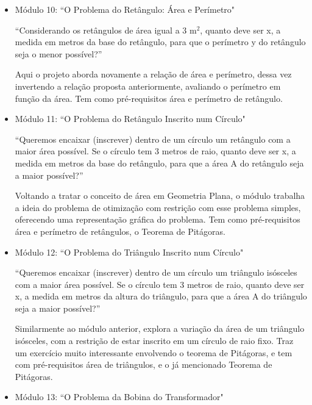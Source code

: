 \begin{itemize}
    
    \item Módulo 10: ``O Problema do Retângulo: Área e Perímetro"
    
    ``Considerando os retângulos de área igual a 3 m$^2$, quanto deve ser x, a medida em metros da base do retângulo, para que o perímetro y do retângulo seja o menor possível?”
    
    Aqui o projeto aborda novamente a relação de área e perímetro, dessa vez invertendo a relação proposta anteriormente, avaliando o perímetro em função da área. Tem como pré-requisitos área e perímetro de retângulo.
    
    \item Módulo 11: ``O Problema do Retângulo Inscrito num Círculo"
    
    ``Queremos encaixar (inscrever) dentro de um círculo um retângulo com a maior área possível. Se o círculo tem 3 metros de raio, quanto deve ser x, a medida em metros da base do retângulo, para que a área A do retângulo seja a maior possível?”
    
    Voltando a tratar o conceito de área em Geometria Plana, o módulo trabalha a ideia do problema de otimização com restrição com esse problema simples, oferecendo uma representação gráfica do problema. Tem como pré-requisitos área e perímetro de retângulos, o Teorema de Pitágoras.

    \item Módulo 12: ``O Problema do Triângulo Inscrito num Círculo"
    
    ``Queremos encaixar (inscrever) dentro de um círculo um triângulo isósceles com a maior área possível. Se o círculo tem 3 metros de raio, quanto deve ser x, a medida em metros da altura do triângulo, para que a área A do triângulo seja a maior possível?”
    
    Similarmente ao módulo anterior, explora a variação da área de um triângulo isósceles, com a restrição de estar inscrito em um círculo de raio fixo. Traz um exercício muito interessante envolvendo o teorema de Pitágoras, e tem com pré-requisitos área de triângulos, e o já mencionado Teorema de Pitágoras.
    
    \item Módulo 13: ``O Problema da Bobina do Transformador"
    

\end{itemize}

